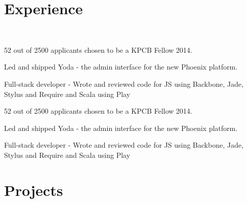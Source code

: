 \documentclass[]{deedy-resume-openfont}
\begin{document}
\hfill
\begin{minipage}[t]{0.66\textwidth} 


\section{Experience}
 \\
\vspace{\topsep} %
\begin{tightemize}
    \item 52 out of 2500 applicants chosen to be a KPCB Fellow 2014.
    \item Led and shipped Yoda - the admin interface for the new Phoenix platform. 
    \item Full-stack developer - Wrote and reviewed code for JS using Backbone, Jade, Stylus and Require and Scala using Play
\end{tightemize}
\begin{tightemize}
    \item 52 out of 2500 applicants chosen to be a KPCB Fellow 2014.
    \item Led and shipped Yoda - the admin interface for the new Phoenix platform. 
    \item Full-stack developer - Wrote and reviewed code for JS using Backbone, Jade, Stylus and Require and Scala using Play
\end{tightemize}

\section{Projects}


\end{minipage}
\end{document}
